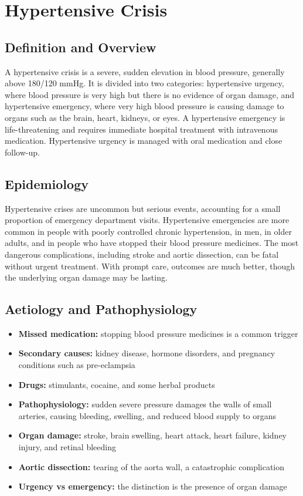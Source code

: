\chapter{Hypertensive Crisis}

\section*{Definition and Overview}
A hypertensive crisis is a severe, sudden elevation in blood pressure, generally above 180/120 mmHg. It is divided into two categories: hypertensive urgency, where blood pressure is very high but there is no evidence of organ damage, and hypertensive emergency, where very high blood pressure is causing damage to organs such as the brain, heart, kidneys, or eyes. A hypertensive emergency is life-threatening and requires immediate hospital treatment with intravenous medication. Hypertensive urgency is managed with oral medication and close follow-up.

\section*{Epidemiology}
Hypertensive crises are uncommon but serious events, accounting for a small proportion of emergency department visits. Hypertensive emergencies are more common in people with poorly controlled chronic hypertension, in men, in older adults, and in people who have stopped their blood pressure medicines. The most dangerous complications, including stroke and aortic dissection, can be fatal without urgent treatment. With prompt care, outcomes are much better, though the underlying organ damage may be lasting.

\section*{Aetiology and Pathophysiology}
\begin{itemize}
    \item \textbf{Missed medication:} stopping blood pressure medicines is a common trigger
    \item \textbf{Secondary causes:} kidney disease, hormone disorders, and pregnancy conditions such as pre-eclampsia
    \item \textbf{Drugs:} stimulants, cocaine, and some herbal products
    \item \textbf{Pathophysiology:} sudden severe pressure damages the walls of small arteries, causing bleeding, swelling, and reduced blood supply to organs
    \item \textbf{Organ damage:} stroke, brain swelling, heart attack, heart failure, kidney injury, and retinal bleeding
    \item \textbf{Aortic dissection:} tearing of the aorta wall, a catastrophic complication
    \item \textbf{Urgency vs emergency:} the distinction is the presence of organ damage
\end{itemize}

